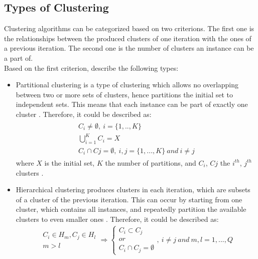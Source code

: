 \subsection{Types of Clustering}
Clustering algorithms can be categorized based on two criterions. The first one is the relationships between the produced clusters of one iteration with the ones of a previous iteration. The second one is the number of clusters an instance can be a part of. \\
Based on the first criterion, \textcite{tanSteinKum} describe the following types: \\
\begin{itemize}
\item Partitional clustering is a type of clustering which allows no overlapping between two or more sets of clusters, hence partitions the initial set to independent sets. This means that each instance can be part of exactly one cluster \autocite[492]{tanSteinKum}. Therefore, it could be described as:
\begin{eqnarray*}
\begin{array}{c}
C_{i} \neq \emptyset, \: i = \{1,..,K\} \\[4pt]
\bigcup_{i=1}^{K} C_{i}=X \\[4pt]
C_{i} \cap C{j} = \emptyset, \: i,j=\{1, ...,K\} \: and \: i \neq j
\end{array}
\end{eqnarray*}
where \(X\) is the initial set, \(K\) the number of partitions, and \(C_{i}\), \(C{j}\) the \(i^{th}\), \(j^{th}\) clusters \autocite[645]{survey}.
\item Hierarchical clustering produces clusters in each iteration, which are subsets of a cluster of the previous iteration. This can occur by starting from one cluster, which contains all instances, and repeatedly partition the available clusters to even smaller ones \autocite[492]{tanSteinKum}. Therefore, it could be described as:
\begin{eqnarray*}
\left.\begin{array}{c}
C_{i} \in H_{m}, C_{j} \in H_{l} \\[4pt]
m>l
\end{array}\right. \Rightarrow
\left\{\begin{array}{c}
C_{i} \subset C_{j} \\
or \\
C_{i} \cap C_{j} = \emptyset
\end{array}\right.
, \: i \neq j \: and \: m,l = 1, ...,Q
\end{eqnarray*}
\end{itemize}
